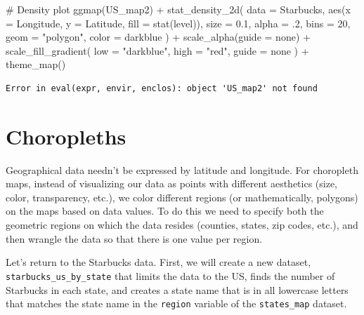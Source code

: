 \documentclass[
  letterpaper,
  DIV=11,
  numbers=noendperiod]{scrreprt}
\newenvironment{Shaded}{\begin{snugshade}}{\end{snugshade}}
\newcommand{\AttributeTok}[1]{\textcolor[rgb]{0.40,0.45,0.13}{#1}}
\newcommand{\CommentTok}[1]{\textcolor[rgb]{0.37,0.37,0.37}{#1}}
\newcommand{\DecValTok}[1]{\textcolor[rgb]{0.68,0.00,0.00}{#1}}
\newcommand{\FloatTok}[1]{\textcolor[rgb]{0.68,0.00,0.00}{#1}}
\newcommand{\FunctionTok}[1]{\textcolor[rgb]{0.28,0.35,0.67}{#1}}
\newcommand{\NormalTok}[1]{\textcolor[rgb]{0.00,0.23,0.31}{#1}}
\newcommand{\SpecialCharTok}[1]{\textcolor[rgb]{0.37,0.37,0.37}{#1}}
\newcommand{\StringTok}[1]{\textcolor[rgb]{0.13,0.47,0.30}{#1}}
\begin{document}
\begin{Shaded}
\begin{Highlighting}[]
\CommentTok{\# Density plot}
\FunctionTok{ggmap}\NormalTok{(US\_map2) }\SpecialCharTok{+}
  \FunctionTok{stat\_density\_2d}\NormalTok{(}
    \AttributeTok{data =}\NormalTok{ Starbucks,}
    \FunctionTok{aes}\NormalTok{(}\AttributeTok{x =}\NormalTok{ Longitude, }\AttributeTok{y =}\NormalTok{ Latitude, }\AttributeTok{fill =} \FunctionTok{stat}\NormalTok{(level)),}
    \AttributeTok{size =} \FloatTok{0.1}\NormalTok{, }\AttributeTok{alpha =}\NormalTok{ .}\DecValTok{2}\NormalTok{, }\AttributeTok{bins =} \DecValTok{20}\NormalTok{, }\AttributeTok{geom =} \StringTok{"polygon"}\NormalTok{, }\AttributeTok{color =} \StringTok{\textquotesingle{}darkblue\textquotesingle{}}
\NormalTok{  ) }\SpecialCharTok{+}
  \FunctionTok{scale\_alpha}\NormalTok{(}\AttributeTok{guide =} \StringTok{\textquotesingle{}none\textquotesingle{}}\NormalTok{) }\SpecialCharTok{+}
  \FunctionTok{scale\_fill\_gradient}\NormalTok{(}
    \AttributeTok{low =} \StringTok{"darkblue"}\NormalTok{, }\AttributeTok{high =} \StringTok{"red"}\NormalTok{,}
    \AttributeTok{guide =} \StringTok{\textquotesingle{}none\textquotesingle{}}
\NormalTok{  ) }\SpecialCharTok{+} 
  \FunctionTok{theme\_map}\NormalTok{()}
\end{Highlighting}
\end{Shaded}

\begin{verbatim}
Error in eval(expr, envir, enclos): object 'US_map2' not found
\end{verbatim}

\section*{Choropleths}\label{choropleths}


Geographical data needn't be expressed by latitude and longitude. For
choropleth maps, instead of visualizing our data as points with
different aesthetics (size, color, transparency, etc.), we color
different regions (or mathematically, polygons) on the maps based on
data values. To do this we need to specify both the geometric regions on
which the data resides (counties, states, zip codes, etc.), and then
wrangle the data so that there is one value per region.

Let's return to the Starbucks data. First, we will create a new dataset,
\texttt{starbucks\_us\_by\_state} that limits the data to the US, finds
the number of Starbucks in each state, and creates a state name that is
in all lowercase letters that matches the state name in the
\texttt{region} variable of the \texttt{states\_map} dataset.
\end{document}
